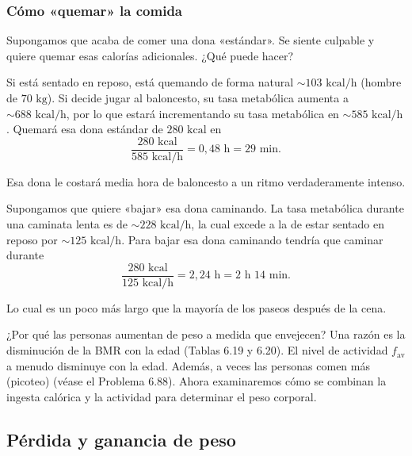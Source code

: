\documentclass[12pt]{book}
\begin{document}
\subsubsection*{Cómo «quemar» la comida}

Supongamos que acaba de comer una dona «estándar». Se siente culpable y quiere quemar esas calorías adicionales. ¿Qué puede hacer?

Si está sentado en reposo, está quemando de forma natural $\sim 103\text{ kcal/h}$ (hombre de $70\text{ kg}$). Si decide jugar al baloncesto, su tasa metabólica aumenta a $\sim 688\text{ kcal/h}$, por lo que estará incrementando su tasa metabólica en $\sim 585\text{ kcal/h}$. Quemará esa dona estándar de $280\text{ kcal}$ en
\begin{equation}
\frac{280\text{ kcal}}{585\text{ kcal/h}} = 0{,}48\text{ h} = 29\text{ min}.
\label{eq:633}
\end{equation}

Esa dona le costará media hora de baloncesto a un ritmo verdaderamente intenso.

Supongamos que quiere «bajar» esa dona caminando. La tasa metabólica durante una caminata lenta es de $\sim 228\text{ kcal/h}$, la cual excede a la de estar sentado en reposo por $\sim 125\text{ kcal/h}$. Para bajar esa dona caminando tendría que caminar durante
\begin{equation}
\frac{280\text{ kcal}}{125\text{ kcal/h}} = 2{,}24\text{ h} = 2\text{ h } 14\text{ min}.
\label{eq:634}
\end{equation}

Lo cual es un poco más largo que la mayoría de los paseos después de la cena.

¿Por qué las personas aumentan de peso a medida que envejecen? Una razón es la disminución de la BMR con la edad (Tablas 6.19 y 6.20). El nivel de actividad $f_{\text{av}}$ a menudo disminuye con la edad. Además, a veces las personas comen más (picoteo) (véase el Problema 6.88). Ahora examinaremos cómo se combinan la ingesta calórica y la actividad para determinar el peso corporal.

\subsection{Pérdida y ganancia de peso}
\end{document}
